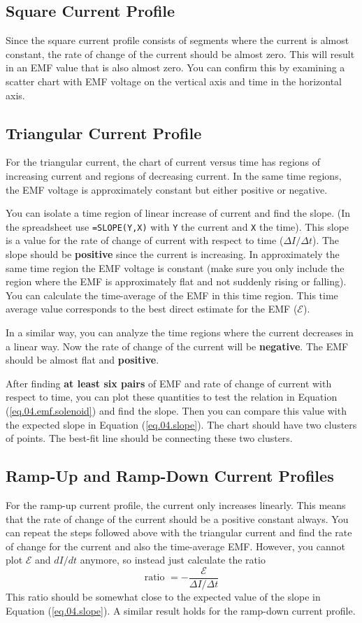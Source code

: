 \subsection{Square Current Profile}
%
Since the square current profile consists of segments where the current is almost constant, the rate of change of the current should be almost zero. This will result in an EMF value that is also almost zero. You can confirm this by examining a scatter chart with EMF voltage on the vertical axis and time in the horizontal axis.
%
\subsection{Triangular Current Profile}
%
For the triangular current, the chart of current versus time has regions of increasing current and regions of decreasing current. In the same time regions, the EMF voltage is approximately constant but either positive or negative.

You can isolate a time region of linear increase of current and find the slope. (In the spreadsheet use \texttt{=SLOPE(Y,X)} with \texttt{Y} the current and \texttt{X} the time). This slope is a value for the rate of change of current with respect to time ($\Delta I / \Delta t$). The slope should be \textbf{positive} since the current is increasing. In approximately the same time region the EMF voltage is constant (make sure you only include the region where the EMF is approximately flat and not suddenly rising or falling). You can calculate the time-average of the EMF in this time region. This time average value corresponds to the best direct estimate for the EMF ($\mathcal{E}$).

In a similar way, you can analyze the time regions where the current decreases in a linear way. Now the rate of change of the current will be \textbf{negative}. The EMF should be almost flat and \textbf{positive}.

After finding \textbf{at least six pairs} of EMF and rate of change of current with respect to time, you can plot these quantities to test the relation in Equation (\ref{eq.04.emf.solenoid}) and find the slope. Then you can compare this value with the expected slope in Equation (\ref{eq.04.slope}). The chart should have two clusters of points. The best-fit line should be connecting these two clusters.
%
\subsection{Ramp-Up and Ramp-Down Current Profiles}
%
For the ramp-up current profile, the current only increases linearly. This means that the rate of change of the current should be a positive constant always. You can repeat the steps followed above with the triangular current and find the rate of change for the current and also the time-average EMF. However, you cannot plot $\mathcal{E}$ and $dI/dt$ anymore, so instead just calculate the ratio
\begin{equation}
	\text{ratio } = -\frac{\mathcal{E}}{\Delta I/\Delta t}
	\label{eq.04.ratio}
\end{equation}
This ratio should be somewhat close to the expected value of the slope in Equation (\ref{eq.04.slope}). A similar result holds for the ramp-down current profile.
%
